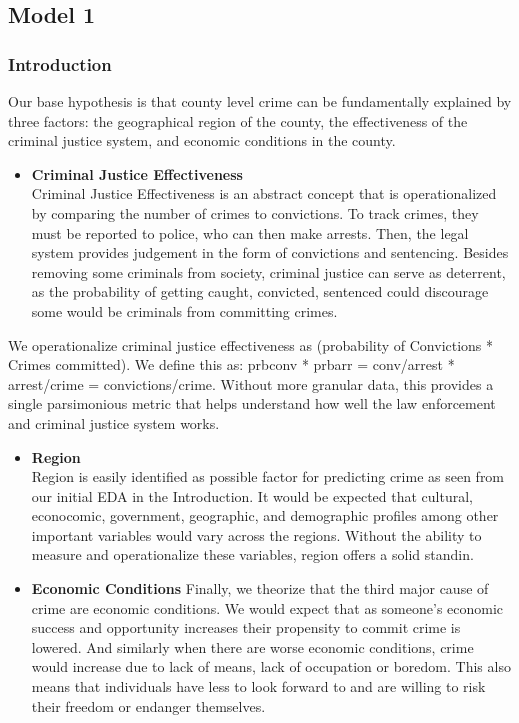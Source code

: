 \documentclass[]{article}
\providecommand{\tightlist}{%
  \setlength{\itemsep}{0pt}\setlength{\parskip}{0pt}}
\begin{document}
\hypertarget{model-1}{%
\subsection{Model 1}\label{model-1}}

\hypertarget{introduction-1}{%
\subsubsection{Introduction}\label{introduction-1}}

Our base hypothesis is that county level crime can be fundamentally
explained by three factors: the geographical region of the county, the
effectiveness of the criminal justice system, and economic conditions in
the county.

\begin{itemize}
\tightlist
\item
  \textbf{Criminal Justice Effectiveness}\\
  Criminal Justice Effectiveness is an abstract concept that is
  operationalized by comparing the number of crimes to convictions. To
  track crimes, they must be reported to police, who can then make
  arrests. Then, the legal system provides judgement in the form of
  convictions and sentencing. Besides removing some criminals from
  society, criminal justice can serve as deterrent, as the probability
  of getting caught, convicted, sentenced could discourage some would be
  criminals from committing crimes.
\end{itemize}

We operationalize criminal justice effectiveness as (probability of
Convictions * Crimes committed). We define this as: prbconv * prbarr =
conv/arrest * arrest/crime = convictions/crime. Without more granular
data, this provides a single parsimonious metric that helps understand
how well the law enforcement and criminal justice system works.

\begin{itemize}
\item
  \textbf{Region}\\
  Region is easily identified as possible factor for predicting crime as
  seen from our initial EDA in the Introduction. It would be expected
  that cultural, econocomic, government, geographic, and demographic
  profiles among other important variables would vary across the
  regions. Without the ability to measure and operationalize these
  variables, region offers a solid standin.
\item
  \textbf{Economic Conditions} Finally, we theorize that the third major
  cause of crime are economic conditions. We would expect that as
  someone's economic success and opportunity increases their propensity
  to commit crime is lowered. And similarly when there are worse
  economic conditions, crime would increase due to lack of means, lack
  of occupation or boredom. This also means that individuals have less
  to look forward to and are willing to risk their freedom or endanger
  themselves.
\end{itemize}
\end{document}
